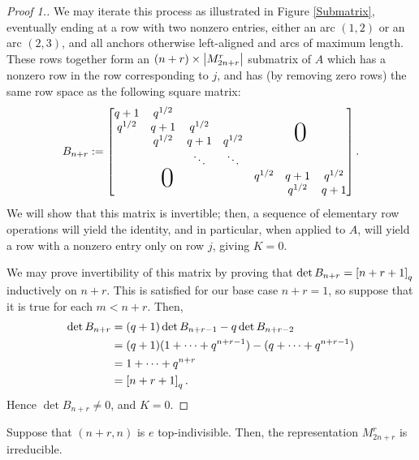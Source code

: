 \documentclass{amsart}
\begin{document}
\begin{proof}[Proof 1.]
  We may iterate this process as illustrated in Figure \ref{Submatrix}, eventually ending at a row with two nonzero entries, either an arc $(1,2)$ or an arc $(2,3)$, and all anchors otherwise left-aligned and arcs of maximum length.
  These rows together form an $(n + r) \times \left| M_{2n + r}^r \right|$ submatrix of $A$ which has a nonzero row in the row corresponding to $j$, and has (by removing zero rows) the same row space as the following square matrix:
  \newcommand*\bigzero{\makebox(0,15){\text{\Huge0}}}
  \newcommand*\bigzerotwo{\makebox(-20,15){\text{\Huge0}}}
  \begin{equation}\label{Bnr}
    B_{n + r} := \begin{bmatrix}
      \begin{matrix}
      q + 1 & q^{1/2} & \\
      q^{1/2} & q + 1 & q^{1/2}\\
      & q^{1/2} & q + 1 & q^{1/2}\\
      &  & \ddots & \ddots
      \end{matrix}
      &   \bigzero\\
      \bigzerotwo & \begin{matrix}
        q^{1/2} & q+1 & q^{1/2}\\
        &  q^{1/2} & q + 1
       \end{matrix}
    \end{bmatrix}.
  \end{equation}
  We will show that this matrix is invertible;
  then, a sequence of elementary row operations will yield the identity, and in particular, when applied to $A$, will yield a row with a nonzero entry only on row $j$, giving $K = 0$.

  We may prove invertibility of this matrix by proving that $\det B_{n + r} = \left[ n + r + 1 \right]_q$ inductively on $n+r$.
  This is satisfied for our base case $n + r = 1$, so suppose that it is true for each $m < n + r$.
  Then,
  \begin{align*}
    \det B_{n+r} &= (q + 1) \det B_{n + r - 1} - q \det B_{n + r - 2}\\
    &= (q + 1)(1 + \dots + q^{n + r - 1}) - (q + \dots + q^{n + r - 1})\\
    &= 1 + \dots + q^{n + r}\\
    &= \left[ n + r + 1 \right]_q.
  \end{align*}
  Hence $\det B_{n + r} \neq 0$, and $K = 0$.
\end{proof}
\begin{theorem}\label{Irreducibility Theorem}
  Suppose that $(n+r,n)$ is $e$ top-indivisible.
  Then, the representation $M_{2n + r}^r$ is irreducible. 
\end{theorem}
\end{document}
